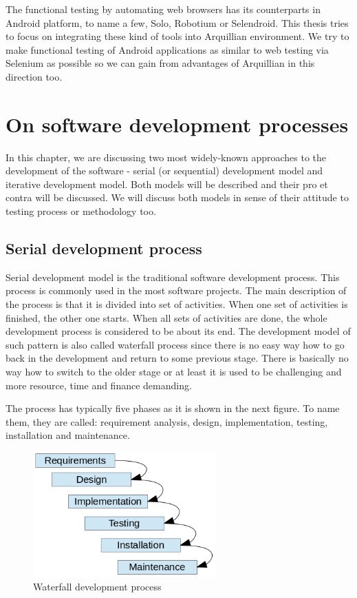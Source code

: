 \documentclass[12pt,final,oneside]{fithesis}
\begin{document}
The functional testing by automating web browsers has its counterparts in Android platform, to name a few, Solo, Robotium or Selendroid. This thesis tries to focus on integrating these kind of tools into Arquillian environment. We try to make functional testing of Android applications as similar to web testing via Selenium as possible so we can gain from advantages of Arquillian in this direction too. 

\chapter{On software development processes}

In this chapter, we are discussing two most widely-known approaches to the development of the software - serial (or sequential) development model and iterative development model. Both models will be described and their pro et contra will be discussed. We will discuss both models in sense of their attitude to testing process or methodology too.

	\section{Serial development process}
	
Serial development model is the traditional software development process. This process is commonly used in the most software projects. The main description of the process is that it is divided into set of activities. When one set of activities is finished, the other one starts. When all sets of activities are done, the whole development process is considered to be about its end. The development model of such pattern is also called waterfall process since there is no easy way how to go back in the development and return to some previous stage. There is basically no way how to switch to the older stage or at least it is used to be challenging and more resource, time and finance demanding.

The process has typically five phases as it is shown in the next figure. To name them, they are called: requirement analysis, design, implementation, testing, installation and maintenance.\\

\begin{figure}
	\centering
	\includegraphics[width=70mm]{img/waterfall.png}
	\caption{Waterfall development process}
	\label{fig:waterfall_process}
\end{figure}
\end{document}
